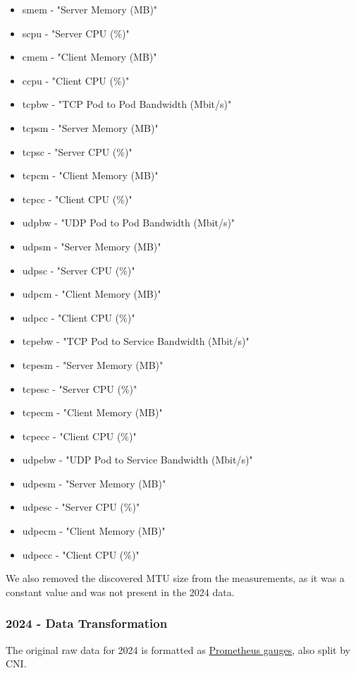 \begin{itemize}
    \item smem - "Server Memory (MB)"
    \item scpu - "Server CPU (\%)"
    \item cmem - "Client Memory (MB)"
    \item ccpu - "Client CPU (\%)"
    \item tcpbw - "TCP Pod to Pod Bandwidth (Mbit/s)"
    \item tcpsm - "Server Memory (MB)"
    \item tcpsc - "Server CPU (\%)"
    \item tcpcm - "Client Memory (MB)"
    \item tcpcc - "Client CPU (\%)"
    \item udpbw - "UDP Pod to Pod Bandwidth (Mbit/s)"
    \item udpsm - "Server Memory (MB)"
    \item udpsc - "Server CPU (\%)"
    \item udpcm - "Client Memory (MB)"
    \item udpcc - "Client CPU (\%)"
    \item tcpebw - "TCP Pod to Service Bandwidth (Mbit/s)"
    \item tcpesm - "Server Memory (MB)"
    \item tcpesc - "Server CPU (\%)"
    \item tcpecm - "Client Memory (MB)"
    \item tcpecc - "Client CPU (\%)"
    \item udpebw - "UDP Pod to Service Bandwidth (Mbit/s)"
    \item udpesm - "Server Memory (MB)"
    \item udpesc - "Server CPU (\%)"
    \item udpecm - "Client Memory (MB)"
    \item udpecc - "Client CPU (\%)"
\end{itemize}

We also removed the discovered MTU size from the measurements, as it was a constant value and was not present in the 2024 data.

\subsubsection{2024 - Data Transformation}

The original raw data for 2024 is formatted as \href{https://prometheus.io/docs/concepts/metric_types/#gauge}{Prometheus gauges}, also split by CNI.

